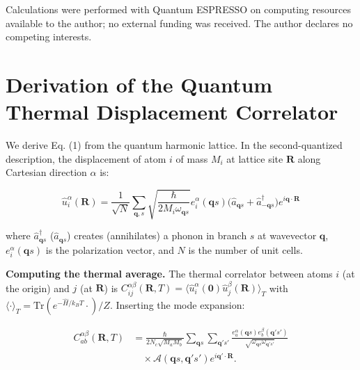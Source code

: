 \documentclass[aps,prb,reprint,amsmath,amssymb,floatfix]{revtex4-2}
\begin{document}
\color{revisionblue}
\begin{acknowledgments}
Calculations were performed with Quantum ESPRESSO on computing resources
available to the author; no external funding was received. The author declares
no competing interests.
\end{acknowledgments}
\color{black}

\appendix

\section{Derivation of the Quantum Thermal Displacement
Correlator}\label{appendix-a-derivation-of-the-quantum-thermal-displacement-correlator}

We derive Eq. (1) from the quantum harmonic lattice. In the
second-quantized description, the displacement of atom \(i\) of mass
\(M_i\) at lattice site \(\mathbf{R}\) along Cartesian direction
\(\alpha\) is:

\begin{equation*}
\hat{u}_i^\alpha(\mathbf{R}) = \frac{1}{\sqrt{N}}\sum_{\mathbf{q},s}\sqrt{\frac{\hbar}{2M_i\omega_{\mathbf{q}s}}} e_i^\alpha(\mathbf{q}s)\bigl(\hat{a}_{\mathbf{q}s} + \hat{a}_{-\mathbf{q}s}^\dagger\bigr)e^{i\mathbf{q}\cdot\mathbf{R}}
\end{equation*}

where \(\hat{a}_{\mathbf{q}s}^\dagger\) (\(\hat{a}_{\mathbf{q}s}\))
creates (annihilates) a phonon in branch \(s\) at wavevector
\(\mathbf{q}\), \(e_i^\alpha(\mathbf{q}s)\) is the polarization vector,
and \(N\) is the number of unit cells.

\textbf{Computing the thermal average.} The thermal correlator between
atoms \(i\) (at the origin) and \(j\) (at \(\mathbf{R}\)) is
\(C_{ij}^{\alpha\beta}(\mathbf{R},T) = \langle\hat{u}_i^\alpha(\mathbf{0})\hat{u}_j^\beta(\mathbf{R})\rangle_T\)
with \(\langle\cdot\rangle_T = \mathrm{Tr}(e^{-\hat{H}/k_BT}\cdot)/Z\).
Inserting the mode expansion:

\color{revisionblue}
{\footnotesize
\begin{equation*}
\begin{aligned}
C_{ab}^{\alpha\beta}(\mathbf R,T)
 &=\frac{\hbar}{2N_c\sqrt{M_aM_b}}
   \sum_{\mathbf q s}\sum_{\mathbf q's'}
   \frac{e_a^\alpha(\mathbf q s)e_b^\beta(\mathbf q's')}
   {\sqrt{\omega_{\mathbf q s}\omega_{\mathbf q's'}}}\\
 &\quad\times\mathcal A(\mathbf q s,\mathbf q's')
 e^{i\mathbf q'\cdot\mathbf R}.
\end{aligned}
\end{equation*}
}
\color{black}
\end{document}
